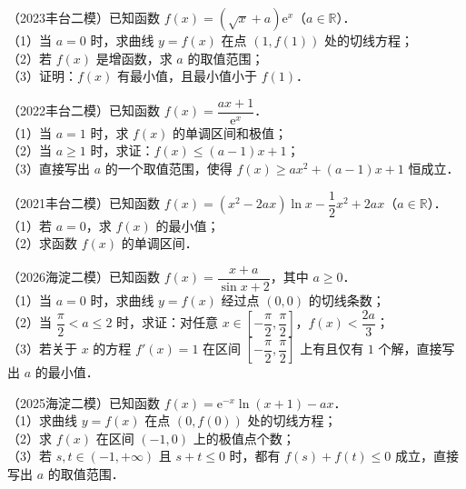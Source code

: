 \begin{example}
（2023丰台二模）已知函数 $f(x)=(\sqrt{x}+a)\mathrm{e}^x$（$a\in\mathbb{R}$）．\\
（1）当 $a=0$ 时，求曲线 $y=f(x)$ 在点 $(1,f(1))$ 处的切线方程；\\
（2）若 $f(x)$ 是增函数，求 $a$ 的取值范围；\\
（3）证明：$f(x)$ 有最小值，且最小值小于 $f(1)$．
\end{example}

\begin{example}
（2022丰台二模）已知函数 $f(x)=\dfrac{ax+1}{\mathrm{e}^x}$．\\
（1）当 $a=1$ 时，求 $f(x)$ 的单调区间和极值；\\
（2）当 $a\geqslant1$ 时，求证：$f(x)\leqslant(a-1)x+1$；\\
（3）直接写出 $a$ 的一个取值范围，使得 $f(x)\geqslant ax^2+(a-1)x+1$ 恒成立．
\end{example}

\begin{example}
（2021丰台二模）已知函数 $f(x)=(x^2-2ax)\ln x-\dfrac12x^2+2ax$（$a\in\mathbb{R}$）．\\
（1）若 $a=0$，求 $f(x)$ 的最小值；\\
（2）求函数 $f(x)$ 的单调区间．
\end{example}

\begin{example}
（2026海淀二模）已知函数 $f(x)=\dfrac{x+a}{\sin x+2}$，其中 $a\geqslant0$．\\
（1）当 $a=0$ 时，求曲线 $y=f(x)$ 经过点 $(0,0)$ 的切线条数；\\
（2）当 $\dfrac\pi2<a\leqslant2$ 时，求证：对任意 $x\in\left[-\dfrac\pi2,\dfrac\pi2\right]$，$f(x)<\dfrac{2a}{3}$；\\
（3）若关于 $x$ 的方程 $f'(x)=1$ 在区间 $\left[-\dfrac\pi2,\dfrac\pi2\right]$ 上有且仅有 $1$ 个解，直接写出 $a$ 的最小值．
\end{example}

\begin{example}
（2025海淀二模）已知函数 $f(x)=\mathrm{e}^{-x}\ln(x+1)-ax$．\\
（1）求曲线 $y=f(x)$ 在点 $(0,f(0))$ 处的切线方程；\\
（2）求 $f(x)$ 在区间 $(-1,0)$ 上的极值点个数；\\
（3）若 $s,t\in(-1,+\infty)$ 且 $s+t\leqslant0$ 时，都有 $f(s)+f(t)\leqslant0$ 成立，直接写出 $a$ 的取值范围．
\end{example}

